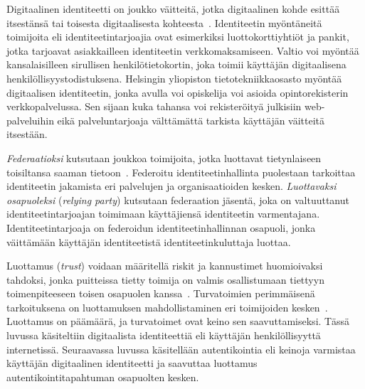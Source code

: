 \documentclass[finnish,gradu]{tktltiki}
\begin{document}
  Digitaalinen identiteetti on joukko väitteitä, jotka digitaalinen kohde esittää itsestänsä tai toisesta digitaalisesta kohteesta~\cite{cameron_laws_of_id_2005, sakimura_identity_2011, cameron_id_arch_2006}. Identiteetin myöntäneitä toimijoita eli identiteetintarjoajia ovat esimerkiksi luottokorttiyhtiöt ja pankit, jotka tarjoavat asiakkailleen identiteetin verkkomaksamiseen. Valtio voi myöntää kansalaisilleen sirullisen henkilötietokortin, joka toimii käyttäjän digitaalisena henkilöllisyystodistuksena. Helsingin yliopiston tietotekniikkaosasto myöntää digitaalisen identiteetin, jonka avulla voi opiskelija voi asioida opintorekisterin verkkopalvelussa. Sen sijaan kuka tahansa voi rekisteröityä julkisiin web-palveluihin eikä palveluntarjoaja välttämättä tarkista käyttäjän väitteitä itsestään.

  \emph{Federaatioksi} kutsutaan joukkoa toimijoita, jotka luottavat tietynlaiseen toisiltansa saaman tietoon~\cite{id_in_federation_systems_2005, federated_auth_case_2008}. Federoitu identiteetinhallinta puolestaan tarkoittaa identiteetin jakamista eri palvelujen ja organisaatioiden kesken. \emph{Luottavaksi osapuoleksi} (\emph{relying party}) kutsutaan federaation jäsentä, joka on valtuuttanut identiteetintarjoajan toimimaan käyttäjiensä identiteetin varmentajana. Identiteetintarjoaja on federoidun identiteetinhallinnan osapuoli, jonka väittämään käyttäjän identiteetistä identiteetinkuluttaja luottaa.

    Luottamus (\emph{trust}) voidaan määritellä riskit ja kannustimet huomioivaksi tahdoksi, jonka puitteissa tietty toimija on valmis osallistumaan tiettyyn toimenpiteeseen toisen osapuolen kanssa~\cite{ruohomaa_kutvonen_trust_management_2005}. Turvatoimien perimmäisenä tarkoituksena on luottamuksen mahdollistaminen eri toimijoiden kesken~\cite{schneier_liars_and_outliers_2012}. Luottamus on päämäärä, ja turvatoimet ovat keino sen saavuttamiseksi. Tässä luvussa käsiteltiin digitaalista identiteettiä eli käyttäjän henkilöllisyyttä internetissä. Seuraavassa luvussa käsitellään autentikointia eli keinoja varmistaa käyttäjän digitaalinen identiteetti ja saavuttaa luottamus autentikointitapahtuman osapuolten kesken.


\end{document}
